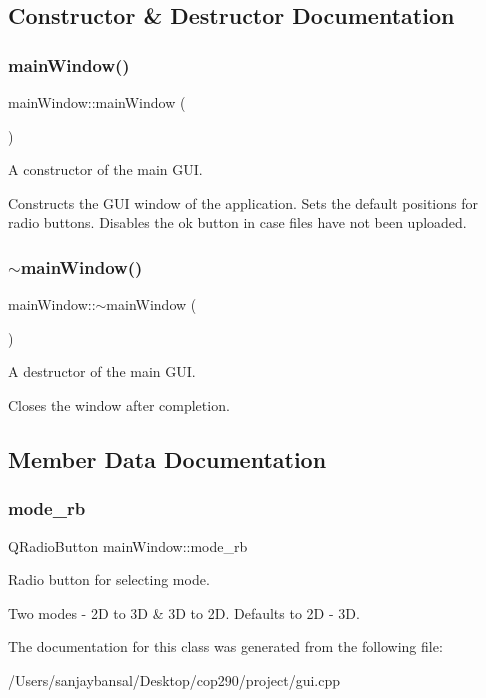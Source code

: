\subsection{Constructor \& Destructor Documentation}
\mbox{\label{classmain_window_a467ea0d8090c122e5b5fd69f77ed3476}} 
\subsubsection{\texorpdfstring{main\+Window()}{mainWindow()}}
{\footnotesize\ttfamily main\+Window\+::main\+Window (\begin{DoxyParamCaption}{ }\end{DoxyParamCaption})}



A constructor of the main G\+UI. 

Constructs the G\+UI window of the application. Sets the default positions for radio buttons. Disables the ok button in case files have not been uploaded. \mbox{\label{classmain_window_a2c4caa71599521dbde5bc35b230ed648}} 
\subsubsection{\texorpdfstring{$\sim$main\+Window()}{~mainWindow()}}
{\footnotesize\ttfamily main\+Window\+::$\sim$main\+Window (\begin{DoxyParamCaption}{ }\end{DoxyParamCaption})}



A destructor of the main G\+UI. 

Closes the window after completion. 

\subsection{Member Data Documentation}
\mbox{\label{classmain_window_abd7445b8de425018c91f10b721e9e314}} 
\subsubsection{\texorpdfstring{mode\+\_\+rb}{mode\_rb}}
{\footnotesize\ttfamily Q\+Radio\+Button main\+Window\+::mode\+\_\+rb}



Radio button for selecting mode. 

Two modes -\/ 2D to 3D \& 3D to 2D. Defaults to 2D -\/ 3D. 

The documentation for this class was generated from the following file\+:\begin{DoxyCompactItemize}
\item 
/\+Users/sanjaybansal/\+Desktop/cop290/project/gui.\+cpp\end{DoxyCompactItemize}
